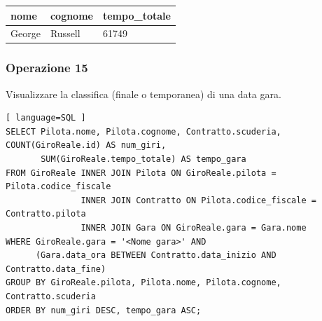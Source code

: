 \documentclass[11pt]{article}
\begin{document}
\begin{table}[H]
    \centering
    \begin{tabular}{|l|l|l|}
    \hline
        \textbf{nome} & \textbf{cognome} & \textbf{tempo\_totale} \\ \hline
        George & Russell & 61749 \\ \hline
    \end{tabular}
\end{table}


\subsubsection{Operazione 15}
Visualizzare la classifica (finale o temporanea) di una data gara.
\begin{lstlisting}[ language=SQL ]
SELECT Pilota.nome, Pilota.cognome, Contratto.scuderia, COUNT(GiroReale.id) AS num_giri, 
       SUM(GiroReale.tempo_totale) AS tempo_gara
FROM GiroReale INNER JOIN Pilota ON GiroReale.pilota = Pilota.codice_fiscale
               INNER JOIN Contratto ON Pilota.codice_fiscale = Contratto.pilota
               INNER JOIN Gara ON GiroReale.gara = Gara.nome
WHERE GiroReale.gara = '<Nome gara>' AND
      (Gara.data_ora BETWEEN Contratto.data_inizio AND Contratto.data_fine)
GROUP BY GiroReale.pilota, Pilota.nome, Pilota.cognome, Contratto.scuderia
ORDER BY num_giri DESC, tempo_gara ASC;
\end{lstlisting}
\end{document}
